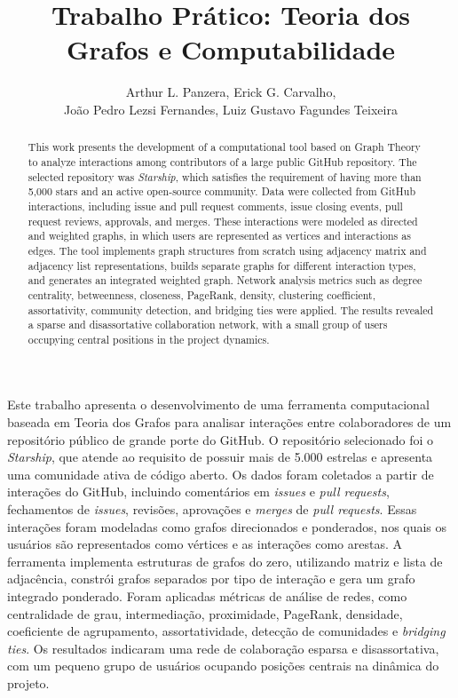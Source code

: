 \documentclass[12pt]{article}
\title{Trabalho Prático: Teoria dos Grafos e Computabilidade}
\author{
Arthur L. Panzera\inst{1}, Erick G. Carvalho\inst{1},\\
João Pedro Lezsi Fernandes\inst{1}, Luiz Gustavo Fagundes Teixeira\inst{1}
}
\begin{document}
 

\maketitle

\begin{abstract}
  This work presents the development of a computational tool based on Graph Theory to analyze interactions among contributors of a large public GitHub repository. The selected repository was \textit{Starship}, which satisfies the requirement of having more than 5,000 stars and an active open-source community. Data were collected from GitHub interactions, including issue and pull request comments, issue closing events, pull request reviews, approvals, and merges. These interactions were modeled as directed and weighted graphs, in which users are represented as vertices and interactions as edges. The tool implements graph structures from scratch using adjacency matrix and adjacency list representations, builds separate graphs for different interaction types, and generates an integrated weighted graph. Network analysis metrics such as degree centrality, betweenness, closeness, PageRank, density, clustering coefficient, assortativity, community detection, and bridging ties were applied. The results revealed a sparse and disassortative collaboration network, with a small group of users occupying central positions in the project dynamics.
\end{abstract}
     
\begin{resumo} 
  Este trabalho apresenta o desenvolvimento de uma ferramenta computacional baseada em Teoria dos Grafos para analisar interações entre colaboradores de um repositório público de grande porte do GitHub. O repositório selecionado foi o \textit{Starship}, que atende ao requisito de possuir mais de 5.000 estrelas e apresenta uma comunidade ativa de código aberto. Os dados foram coletados a partir de interações do GitHub, incluindo comentários em \textit{issues} e \textit{pull requests}, fechamentos de \textit{issues}, revisões, aprovações e \textit{merges} de \textit{pull requests}. Essas interações foram modeladas como grafos direcionados e ponderados, nos quais os usuários são representados como vértices e as interações como arestas. A ferramenta implementa estruturas de grafos do zero, utilizando matriz e lista de adjacência, constrói grafos separados por tipo de interação e gera um grafo integrado ponderado. Foram aplicadas métricas de análise de redes, como centralidade de grau, intermediação, proximidade, PageRank, densidade, coeficiente de agrupamento, assortatividade, detecção de comunidades e \textit{bridging ties}. Os resultados indicaram uma rede de colaboração esparsa e disassortativa, com um pequeno grupo de usuários ocupando posições centrais na dinâmica do projeto.
\end{resumo}
\end{document}
